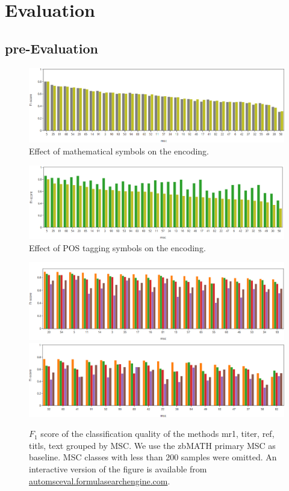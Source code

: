 \section{Evaluation}\label{sec:eval}

\subsection{pre-Evaluation}

\begin{figure}[h]
  \centering
  \includegraphics[width=1.1\textwidth]{mathEncoding.png}
  \caption{Effect of mathematical symbols on the encoding.}
\end{figure}

\begin{figure}[h]
  \centering
  \includegraphics[width=1.1\textwidth]{POSeffekt.png}
  \caption{Effect of POS tagging symbols on the encoding.}
\end{figure}

\begin{figure}[h]
  \centering
  \includegraphics[width=1.1\textwidth]{overview1.png}
  \includegraphics[width=1.1\textwidth]{overview2.png}
  \caption{$F_1$ score of the classification quality of the methods mr1, titer, ref, titls, text grouped by MSC. We use the zbMATH primary MSC as baseline. MSC classes with less than 200 samples were omitted. An interactive version of the figure is available from \url{automsceval.formulasearchengine.com}.}
\end{figure}


